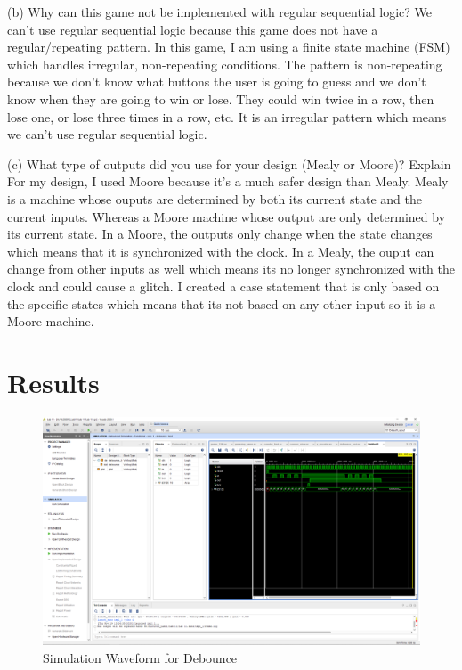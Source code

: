 \documentclass[11pt]{article}
\begin{document}
(b) Why can this game not be implemented with regular sequential logic? \newline
 We can't use regular sequential logic because this game does not have a regular/repeating pattern. In this game, I am using a finite state machine (FSM) which handles irregular, non-repeating conditions. The pattern is non-repeating because we don't know what buttons the user is going to guess and we don't know when they are going to win or lose. They could win twice in a row, then lose one, or lose three times in a row, etc. It is an irregular pattern which means we can't use regular sequential logic. \newline

(c) What type of outputs did you use for your design (Mealy or Moore)? Explain \newline
 For my design, I used Moore because it's a much safer design than Mealy. Mealy is a machine whose ouputs are determined by both its current state and the current inputs. Whereas a Moore machine whose output are only determined by its current state. In a Moore, the outputs only change when the state changes which means that it is synchronized with the clock. In a Mealy, the ouput can change from other inputs as well which means its no longer synchronized with the clock and could cause a glitch. I created a case statement that is only based on the specific states which means that its not based on any other input so it is a Moore machine. 



\section*{Results}

\begin{figure}[ht]\centering
	\caption{Simulation Waveform for Debounce}
	\includegraphics [width=1\textwidth,trim=640 550 10 135, clip]{debounce_sim}
\end{figure}
\end{document}
